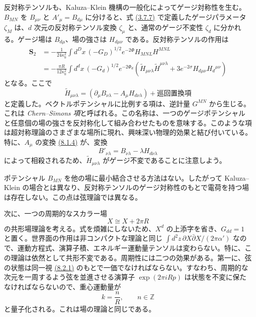 反対称テンソルも、Kaluza--Klein 機構の一般化によってゲージ対称性を生む。$B_{MN}$ を $B_{\mu\nu}$ と $A'_\mu=B_{d\mu}$ に分けると、式 \hyperref[eq:3.7.7]{(3.7.7)} で定義したゲージパラメータ $\zeta_M$ は、$d$ 次元の反対称テンソル変換 $\zeta_\mu$ と、通常のゲージ不変性 $\zeta_d$ に分かれる。ゲージ場は $B_{d\mu}$、場の強さは $H_{d\mu\nu}$ である。反対称テンソルの作用は
\begin{equation}
\begin{aligned}
\bm S_2&=-\frac1{24\kappa_0^2}\int d^Dx\,(-G_D)^{1/2}e^{-2\Phi}H_{MNL}H^{MNL}\\
&=-\frac{\pi R}{12\kappa_0^2}\int d^dx\,(-G_d)^{1/2}e^{-2\Phi_d}
\left(\widetilde H_{\mu\nu\lambda}\widetilde H^{\mu\nu\lambda}
+3e^{-2\sigma}H_{d\mu\nu}H_d{}^{\mu\nu}\right)
\end{aligned}
\tag{8.1.13}\label{eq:8.1.13}
\end{equation}
となる。ここで
\begin{equation}
\widetilde H_{\mu\nu\lambda}=(\partial_\mu B_{\nu\lambda}-A_\mu H_{d\nu\lambda})
+\text{巡回置換項}
\tag{8.1.14}\label{eq:8.1.14}
\end{equation}
と定義した。ベクトルポテンシャルに比例する項は、逆計量 $G^{MN}$ から生じる。これは \emph{Chern--Simons 項}と呼ばれる。この名称は、一つのゲージポテンシャルと任意個の場の強さを反対称化して組み合わせたものを意味する。このような項は超対称理論のさまざまな場所に現れ、興味深い物理的効果と結び付いている。特に、$A_\mu$ の変換 \hyperref[eq:8.1.4]{(8.1.4)} が、変換
\begin{equation}
B'_{\nu\lambda}=B_{\nu\lambda}-\lambda H_{d\nu\lambda}
\tag{8.1.15}\label{eq:8.1.15}
\end{equation}
によって相殺されるため、$\widetilde H_{\mu\nu\lambda}$ がゲージ不変であることに注意しよう。

ポテンシャル $B_{MN}$ を他の場に最小結合させる方法はない。したがって Kaluza--Klein の場合とは異なり、反対称テンソルのゲージ対称性のもとで電荷を持つ場は存在しない。この点は弦理論では異なる。

\label{sec:8.2}

次に、一つの周期的なスカラー場
\begin{equation}
X\cong X+2\pi R
\tag{8.2.1}\label{eq:8.2.1}
\end{equation}
の共形場理論を考える。式を煩雑にしないため、$X^d$ の上添字を省き、$G_{dd}=1$ と置く。世界面の作用は非コンパクトな理論と同じ $\int d^2z\,\partial X\bar\partial X/(2\pi\alpha')$ なので、運動方程式、演算子積、エネルギー運動量テンソルは変わらない。特に、この理論は依然として共形不変である。周期性には二つの効果がある。第一に、弦の状態は同一視 \hyperref[eq:8.2.1]{(8.2.1)} のもとで一価でなければならない。すなわち、周期的な次元を一周するよう弦を並進させる演算子 $\exp(2\pi iRp)$ は状態を不変に保たなければならないので、重心運動量が
\begin{equation}
k=\frac nR,\qquad n\in\mathbb Z
\tag{8.2.2}\label{eq:8.2.2}
\end{equation}
と量子化される。これは場の理論と同じである。

